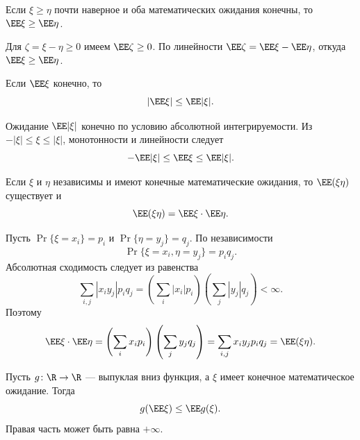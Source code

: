 \begin{theorem}
    Если $\xi\geq\eta$ почти наверное и оба математических ожидания конечны,
    то $\EE\xi\geq\EE\eta$.
\end{theorem}

\begin{Proof}
    Для $\zeta=\xi-\eta\geq0$ имеем $\EE\zeta\geq0$.
    По линейности $\EE\zeta=\EE\xi-\EE\eta$, откуда
    $\EE\xi\geq\EE\eta$.
\end{Proof}

\begin{theorem}
    Если $\EE\xi$ конечно, то
    \[
        |\EE\xi|\leq\EE|\xi|.
    \]
\end{theorem}

\begin{Proof}
    Ожидание $\EE|\xi|$ конечно по условию абсолютной интегрируемости.
    Из $-|\xi|\leq\xi\leq|\xi|$, монотонности и линейности следует
    \[
        -\EE|\xi|\leq\EE\xi\leq\EE|\xi|.
    \]
\end{Proof}


\begin{theorem}
    Если $\xi$ и $\eta$ независимы и имеют конечные математические
    ожидания, то $\EE(\xi\eta)$ существует и
    \[
        \EE(\xi\eta)=\EE\xi\cdot\EE\eta.
    \]
\end{theorem}

\begin{Proof}
    Пусть $\Pr\{\xi=x_i\}=p_i$ и $\Pr\{\eta=y_j\}=q_j$.
    По независимости
    \[
        \Pr\{\xi=x_i,\eta=y_j\}=p_iq_j.
    \]
    Абсолютная сходимость следует из равенства
    \[
        \sum_{i,j}|x_iy_j|p_iq_j
        =\left(\sum_i|x_i|p_i\right)
         \left(\sum_j|y_j|q_j\right)<\infty.
    \]
    Поэтому
    \[
        \EE\xi\cdot\EE\eta
        =\left(\sum_i x_ip_i\right)\left(\sum_j y_jq_j\right)
        =\sum_{i,j}x_iy_jp_iq_j=\EE(\xi\eta).
    \]
\end{Proof}

\begin{theorem}
    Пусть $g\colon\R\to\R$ --- выпуклая вниз функция,
    а $\xi$ имеет конечное математическое ожидание. Тогда
    \[
        g(\EE\xi)\leq\EE g(\xi).
    \]
    Правая часть может быть равна $+\infty$.
\end{theorem}

